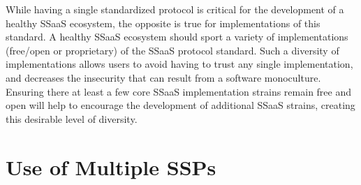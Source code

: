 While having a single standardized protocol is critical for the
development of a healthy SSaaS ecosystem, the opposite is true for
implementations of this standard. A healthy SSaaS ecosystem should
sport a variety of implementations (free/open or proprietary) of the
SSaaS protocol standard. Such a diversity of implementations allows
users to avoid having to trust any single implementation, and
decreases the insecurity that can result from a software
monoculture. Ensuring there at least a few core SSaaS implementation
strains remain free and open will help to encourage the development of
additional SSaaS strains, creating this desirable level of diversity.

\section{Use of Multiple SSPs}

